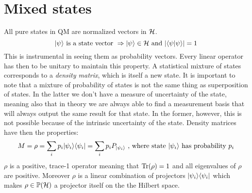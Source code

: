 \section{Mixed states}
	All pure states in QM are normalized vectors in $\mathcal{H}$.
	$$ |\psi \rangle \text{ is a state vector } \Rightarrow |\psi \rangle\in\mathcal{H} \text{ and }  \vert\langle\psi|\psi\rangle\vert = 1$$
	This is instrumental in seeing them as probability vectors. 
	Every linear operator has then to be unitary to maintain this property.
	A statistical mixture of states corresponds to a \emph{density matrix}, which is itself a new state. 
	It is important to note that a mixture of probability of states is not the same thing as superposition of states. In the latter we don't have a measure of uncertainty of the state, meaning also that in theory we are always able to find a measurement basis that will always output the same result for that state. 
	In the former, however, this is not possible because of the intrinsic uncertainty of the state.
	Density matrices have then the properties:
	$$ M = \rho = \sum_i p_i |\psi_i \rangle\langle \psi_i| = \sum_i p_i P_{|\psi_i \rangle} \text{  , where state }|\psi_i \rangle\text{ has probability } p_i $$ 
	$\rho$ is a positive, trace-1 operator meaning that $\operatorname{Tr}(\rho) = 1$ and all eigenvalues of $\rho$ are positive. 
	Moreover $\rho$ is a linear combination of projectors $|\psi_i\rangle\langle \psi_i|$ which makes $\rho\in\mathbb{P}(\mathcal{H})$ a projector itself on the the Hilbert space.

%
